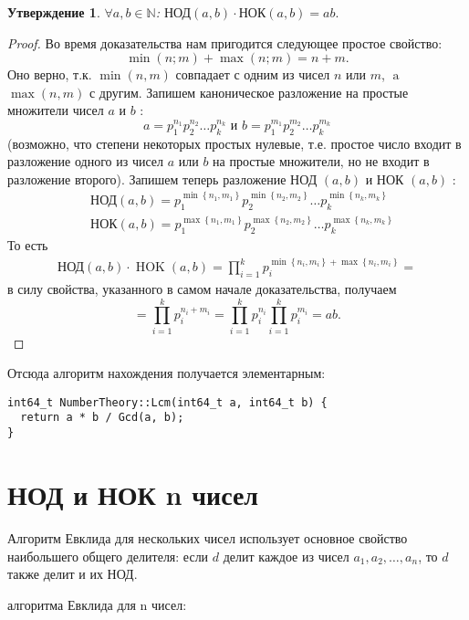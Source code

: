 \documentclass[12pt, a4paper, openany]{book}
\newtheorem*{statement}{Утверждение}
\begin{document}
\begin{statement}
$\forall a, b \in \mathbb{N}$:
$\text{НОД}(a, b) \cdot \text{НОК}(a, b) = ab.$
\end{statement}
\begin{proof}
\noindent
Во время доказательства нам пригодится следующее простое свойство:
$$
\min (n ; m)+\max (n ; m)=n+m .
$$
\noindent
Оно верно, т.к. $\min (n, m)$ совпадает с одним из чисел $n$ или $m$, $\operatorname{a }$ $\max (n, m)$ с другим.
Запишем каноническое разложение на простые множители чисел $a$ и $b$ :
$$
a=p_1^{n_1} p_2^{n_2} \ldots p_k^{n_k} \text { и } b=p_1^{m_1} p_2^{m_2} \ldots p_k^{m_k}
$$
(возможно, что степени некоторых простых нулевые, т.е. простое число входит в разложение одного из чисел $a$ или $b$ на простые множители, но не входит в разложение второго). Запишем теперь разложение НОД $(a, b)$ и НОК $(a, b)$ :
$$
\begin{aligned}
& \text {НОД}(a, b)=p_1^{\min \left\{n_1, m_1\right\}} p_2^{\min \left\{n_2, m_2\right\}} \ldots p_k^{\min \left\{n_k, m_k\right\}} \\
& \text {НОК}(a, b)=p_1^{\max \left\{n_1, m_1\right\}} p_2^{\max \left\{n_2, m_2\right\}} \ldots p_k^{\max \left\{n_k, m_k\right\}}
\end{aligned}
$$
\noindent
То есть
$$
\begin{gathered}
\text {НОД}(a, b) \cdot \operatorname{HOK}(a, b)=\prod_{i=1}^k p_i^{\min \left\{n_i, m_i\right\}+\max \left\{n_i, m_i\right\}}=
\end{gathered}
$$
\noindent
в силу свойства, указанного в самом начале доказательства, получаем
$$
=\prod_{i=1}^k p_i^{n_i + m_i}=\prod_{i=1}^k p_i^{n_i}\prod_{i=1}^k p_i^{m_i}=a b .
$$
\end{proof}

\newpage
\noindent
Отсюда алгоритм нахождения получается элементарным:
\begin{lstlisting}
int64_t NumberTheory::Lcm(int64_t a, int64_t b) {
  return a * b / Gcd(a, b);
}
\end{lstlisting}

\section{НОД и НОК n чисел}

Алгоритм Евклида для нескольких чисел использует основное свойство наибольшего общего делителя: если $d$ делит каждое из чисел $a_1, a_2, …, a_n$, то $d$ также делит и их НОД.

\vspace{12pt} алгоритма Евклида для n чисел:
\end{document}
